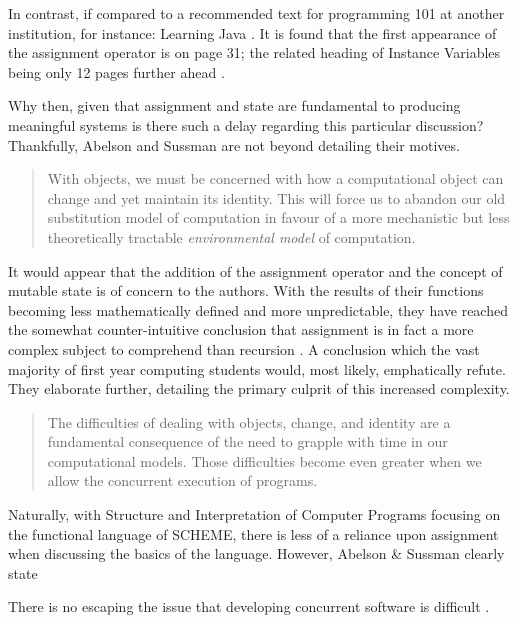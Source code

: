 \documentclass[12pt,a4paper]{article}
\begin{document}
In contrast, if compared to a recommended text for programming 101 at another institution, for instance: Learning Java \cite{learningJava}. It is found that the first appearance of the assignment operator is on page 31; the related heading of Instance Variables being only 12 pages further ahead \cite{learningJava}.

Why then, given that assignment and state are fundamental to producing meaningful systems \cite{structureAndInterpretation} is there such a delay regarding this particular discussion? Thankfully, Abelson and Sussman are not beyond detailing their motives.

\begin{quote}
    With objects, we must be concerned with how a computational object can change and yet maintain its identity. This will force us to abandon our old substitution model of computation in favour of a more mechanistic but less theoretically tractable \textit{environmental model} of computation. \cite{structureAndInterpretation}
\end{quote}

It would appear that the addition of the assignment operator and the concept of mutable state is of concern to the authors. With the results of their functions becoming less mathematically defined and more unpredictable, they have reached the somewhat counter-intuitive conclusion that assignment is in fact a more complex subject to comprehend than recursion \cite{structureAndInterpretation}. A conclusion which the vast majority of first year computing students would, most likely, emphatically refute. They elaborate further, detailing the primary culprit of this increased complexity.

\begin{quote}
    The difficulties of dealing with objects, change, and identity are a fundamental consequence of the need to grapple with time in our computational models. Those difficulties become even greater when we allow the concurrent execution of programs. \cite{structureAndInterpretation}
\end{quote}


Naturally, with Structure and Interpretation of Computer Programs focusing on the functional language of SCHEME, there is less of a reliance upon assignment when discussing the basics of the language. However, Abelson \& Sussman clearly state 

There is no escaping the issue that developing concurrent software is difficult \cite{concurrencyChallenges,theConcurrencyChallenge}.
\end{document}
